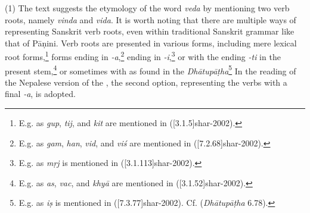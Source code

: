 (1) The text suggests the etymology of the word \emph{veda} by mentioning 
two verb roots, namely \emph{vinda} and \emph{vida}. 
	It is worth noting that there are multiple ways of representing Sanskrit verb 
roots, 
	even within traditional Sanskrit grammar like that of Pāṇini. 
	Verb roots are presented in various forms, including mere lexical root 
forms,\footnote{
		E.g. as \root \emph{gup}, \root \emph{tij}, and \root \emph{kit} are 
mentioned in 
			 (\volcite{}[3.1.5]{shar-2002}).}	 		
   forms ending in \emph{-a},\footnote{
 		 		E.g. as \root \emph{gam}, \root \emph{han}, \root \emph{vid}, and 
\root \emph{viś} are mentioned in  
(\volcite{}[7.2.68]{shar-2002}).}	 		 
 		 ending in \emph{-i},\footnote{ 
 		E.g. as \root \emph{mṛj} is mentioned in  
(\volcite{}[3.1.113]{shar-2002}).}	 		 
	  or with the ending \emph{-ti} in the present stem,\footnote{
  		E.g. as \root \emph{as}, \root \emph{vac}, and \root \emph{khyā} are 
mentioned in
   		 (\volcite[]{}[3.1.52]{shar-2002}).} 		   
	    or sometimes with  as found in the 
\emph{Dhātupāṭha}\footnote{
   		E.g. as \root \emph{iṣ} is mentioned in  
([7.3.77]{shar-2002}). 
   		Cf.  (\emph{Dhātupāṭha} 6.78).} 
	In the reading of the Nepalese version of the \SS, the second option, 
	representing the verbs with a final \emph{-a}, is adopted. 
	 		
